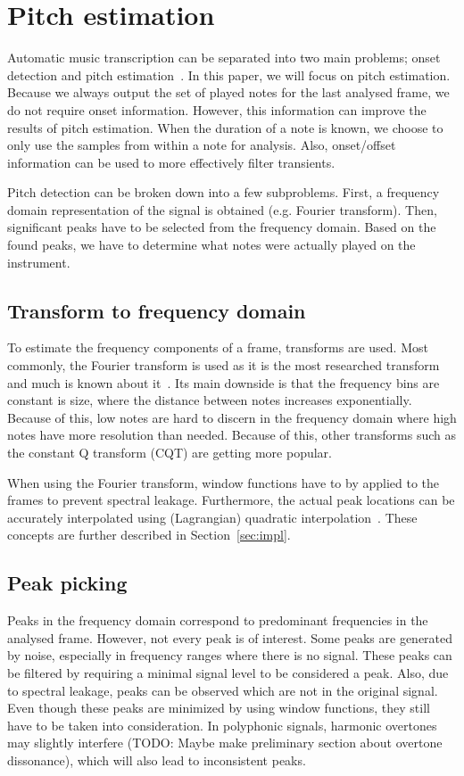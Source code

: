 \documentclass[10pt,twocolumn]{article}
\begin{document}
\section{Pitch estimation}
Automatic music transcription can be separated into two main problems; onset detection and pitch estimation~\cite{survey2}. In this paper, we will focus on pitch estimation. Because we always output the set of played notes for the last analysed frame, we do not require onset information. However, this information can improve the results of pitch estimation. When the duration of a note is known, we choose to only use the samples from within a note for analysis. Also, onset/offset information can be used to more effectively filter transients.

Pitch detection can be broken down into a few subproblems. First, a frequency domain representation of the signal is obtained (e.g. Fourier transform). Then, significant peaks have to be selected from the frequency domain. Based on the found peaks, we have to determine what notes were actually played on the instrument.

\subsection{Transform to frequency domain}
To estimate the frequency components of a frame, transforms are used. Most commonly, the Fourier transform is used as it is the most researched transform and much is known about it~\cite{survey2}. Its main downside is that the frequency bins are constant is size, where the distance between notes increases exponentially. Because of this, low notes are hard to discern in the frequency domain where high notes have more resolution than needed. Because of this, other transforms such as the constant Q transform (CQT) are getting more popular.

When using the Fourier transform, window functions have to by applied to the frames to prevent spectral leakage. Furthermore, the actual peak locations can be accurately interpolated using (Lagrangian) quadratic interpolation~\cite{interpol}. These concepts are further described in Section~\ref{sec:impl}.

\subsection{Peak picking}
Peaks in the frequency domain correspond to predominant frequencies in the analysed frame. However, not every peak is of interest. Some peaks are generated by noise, especially in frequency ranges where there is no signal. These peaks can be filtered by requiring a minimal signal level to be considered a peak. Also, due to spectral leakage, peaks can be observed which are not in the original signal. Even though these peaks are minimized by using window functions, they still have to be taken into consideration. In polyphonic signals, harmonic overtones may slightly interfere (TODO: Maybe make preliminary section about overtone dissonance), which will also lead to inconsistent peaks.
\end{document}
